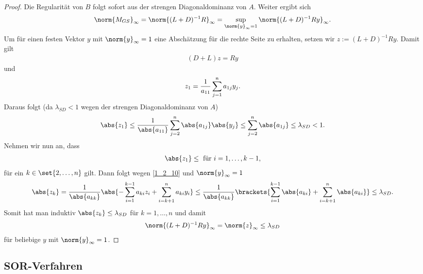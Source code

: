 \begin{proof}
	Die Regularität von $B$ folgt sofort aus der strengen Diagonaldominanz von $A$. Weiter ergibt sich
	\begin{align}
		\norm{M_{GS}}_{\infty} = \norm{(L+D)^{-1}R}_{\infty} = \sup_{\norm{y}_{\infty}=1} \norm{(L+D)^{-1}Ry}_{\infty}. \notag
	\end{align}
	Um für einen festen Vektor $y$ mit $\norm{y}_{\infty} = 1$ eine Abschätzung für die rechte Seite zu erhalten, setzen wir $z:= (L+D)^{-1}Ry$. Damit gilt
	\begin{align}
		(D+L)z = Ry \label{1_2_10}
	\end{align}
	und
	\begin{align}
	z_1 = \frac{1}{a_{11}} \sum_{j=1}^{n} a_{1j}y_j. \notag
	\end{align}
	Daraus folgt (da $\lambda_{SD} < 1$ wegen der strengen Diagonaldominanz von $A$)
	\begin{align}
		\abs{z_1} 
		\le \frac{1}{\abs{a_{11}}} \sum_{j=2}^{n} \abs{a_{1j}}\abs{y_j} 
		\le \sum_{j=2}^{n} \abs{a_{1j}} \le \lambda_{SD} < 1.\notag
	\end{align}
	Nehmen wir nun an, dass
	\begin{align}
		\abs{z_1} \le \text{ für } i = 1, \dots, k-1, \notag
	\end{align}
	für ein $k \in \set{2,\dots,n}$ gilt. Dann folgt wegen \cref{1_2_10} und $\norm{y}_{\infty} = 1$
	\begin{align}
		\abs{z_k} = \frac{1}{\abs{a_{kk}}} \abs{-\sum_{i=1}^{k-1} a_{ki}z_i + \sum_{i=k+1}^{n} a_{ki}y_i} 
		\le \frac{1}{\abs{a_{kk}}} \brackets{\sum_{i=1}^{k-1} \abs{a_{ki}} + \sum_{i=k+1}^{n} \abs{a_{ki}}} \le \lambda_{SD}. \notag
	\end{align}
	Somit hat man induktiv $\abs{z_k} \le \lambda_{SD}$ für $k = 1, \dots, n$ und damit
	\begin{align}
		\norm{(L+D)^{-1}Ry}_{\infty} = \norm{z}_{\infty} \le \lambda_{SD} \notag
	\end{align}
	für beliebige $y$ mit $\norm{y}_{\infty} = 1$.
\end{proof}

\subsection{SOR-Verfahren}

